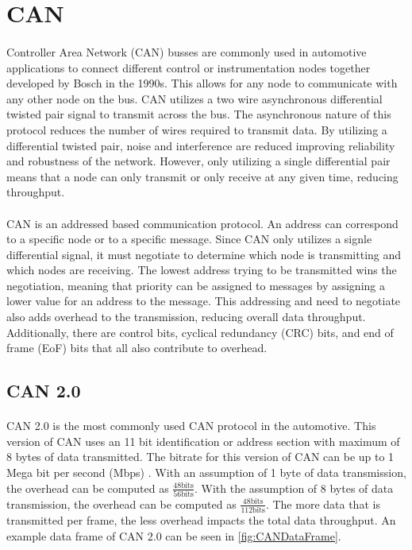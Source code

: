 \section{CAN}

\paragraph{}
Controller Area Network (CAN) busses are commonly used in automotive applications to connect different control or instrumentation nodes together developed by Bosch in the 1990s.
This allows for any node to communicate with any other node on the bus.
CAN utilizes a two wire asynchronous differential twisted pair signal to transmit across the bus.
The asynchronous nature of this protocol reduces the number of wires required to transmit data.
By utilizing a differential twisted pair, noise and interference are reduced improving reliability and robustness of the network.
However, only utilizing a single differential pair means that a node can only transmit or only receive at any given time, reducing throughput.

\paragraph{}
CAN is an addressed based communication protocol.
An address can correspond to a specific node or to a specific message.
Since CAN only utilizes a signle differential signal, it must negotiate to determine which node is transmitting and which nodes are receiving.
The lowest address trying to be transmitted wins the negotiation, meaning that priority can be assigned to messages by assigning a lower value for an address to the message.
This addressing and need to negotiate also adds overhead to the transmission, reducing overall data throughput.
Additionally, there are control bits, cyclical redundancy (CRC) bits, and end of frame (EoF) bits that all also contribute to overhead.

\subsection{CAN 2.0}

\paragraph{}
CAN 2.0 is the most commonly used CAN protocol in the automotive.
This version of CAN uses an 11 bit identification or address section with maximum of 8 bytes of data transmitted.
The bitrate for this version of CAN can be up to 1 Mega bit per second (Mbps) \cite{BOSCH_CAN20}.
With an assumption of 1 byte of data transmission, the overhead can be computed as $\frac{48 \text{bits}}{56 \text{bits}}$.  With the assumption of 8 bytes of data transmission, the overhead can be computed as $\frac{48 \text{bits}}{112 \text{bits}}$.
The more data that is transmitted per frame, the less overhead impacts the total data throughput.
An example data frame of CAN 2.0 can be seen in \cref{fig:CANDataFrame}.

